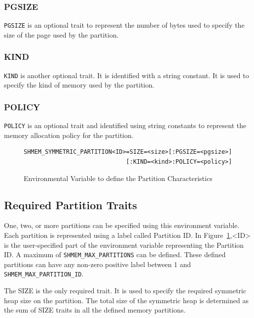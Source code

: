 \subsubsection{PGSIZE} \texttt{PGSIZE} is an optional trait to
represent the number of bytes used to specify the size of the
page used by the partition.

\subsubsection{KIND} \texttt{KIND} is another optional trait.
It is identified with a string constant. It is used to specify
the kind of memory used by the partition.

\subsubsection{POLICY} \texttt{POLICY} is an optional trait and
identified using string constants to represent the memory
allocation policy for the partition.

\begin{figure}
    \lstset{language=c,
            keywordstyle=\bfseries,
            basicstyle=\tt\small,
            frame=single}
    \begin{lstlisting}
SHMEM_SYMMETRIC_PARTITION<ID>=SIZE=<size>[:PGSIZE=<pgsize>]
                             [:KIND=<kind>:POLICY=<policy>]
    \end{lstlisting}
    \vspace{-10pt}
    \caption{Environmental Variable to define the Partition
    Characteristics}
    \label{fig:env}
\end{figure}

\subsection{Required Partition Traits}
\label{src:smempart/req}
One, two, or more partitions can be specified using this
environment variable. Each partition is represented using a label
called Partition ID. In Figure~\ref{fig:env},\textless ID\textgreater
is the user-specified part of the environment variable representing
the Partition ID. A maximum of \texttt{SHMEM\_MAX\_PARTITIONS} can
be defined. These defined partitions can have any non-zero positive
label between 1 and \texttt{SHMEM\_MAX\_PARTITION\_ID}.

The SIZE is the only required trait. It is used to specify the required
symmetric heap size on the partition. The total size of the symmetric
heap is determined as the sum of SIZE traits in all the defined memory
partitions.

